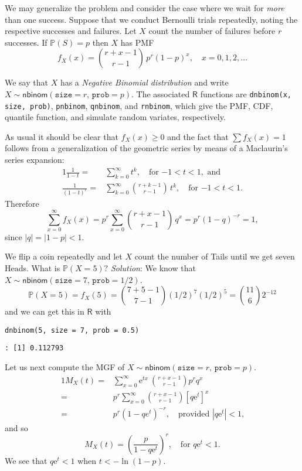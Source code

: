 We may generalize the problem and consider the case where we wait for
\emph{more} than one success. Suppose that we conduct Bernoulli trials
repeatedly, noting the respective successes and failures. Let \(X\)
count the number of failures before \(r\) successes. If
\(\mathbb{P}(S)=p\) then \(X\) has PMF
\begin{equation}
f_{X}(x)={r+x-1 \choose r-1}\, p^{r}(1-p)^{x},\quad x=0,1,2,\ldots
\end{equation}

We say that \(X\) has a \emph{Negative Binomial distribution} and write
\(X\sim\mathsf{nbinom}(\mathtt{size}=r,\,\mathtt{prob}=p)\). The
associated \(\mathsf{R}\) functions are \texttt{dnbinom(x, size, prob)},
\texttt{pnbinom}, \texttt{qnbinom}, and \texttt{rnbinom}, which give the PMF, CDF, quantile
function, and simulate random variates, respectively.

As usual it should be clear that \(f_{X}(x)\geq 0\) and the fact that
\(\sum f_{X}(x)=1\) follows from a generalization of the geometric
series by means of a Maclaurin's series expansion:
\begin{alignat}{1}
\frac{1}{1-t}= & \sum_{k=0}^{\infty}t^{k},\quad \mbox{for \(-1 < t < 1\)},\mbox{ and}\\
\frac{1}{(1-t)^{r}}= & \sum_{k=0}^{\infty}{r+k-1 \choose r-1}\, t^{k},\quad \mbox{for \(-1 < t < 1\)}.
\end{alignat}
Therefore
\begin{equation}
\sum_{x=0}^{\infty}f_{X}(x)=p^{r}\sum_{x=0}^{\infty}{r+x-1 \choose r-1}\, q^{x}=p^{r}(1-q)^{-r}=1,
\end{equation}
since \(|q|=|1-p|<1\). 


We flip a coin repeatedly and let \(X\) count the number of Tails
until we get seven Heads. What is \(\mathbb{P}(X=5)?\) \emph{Solution}: We
know that
\(X\sim\mathsf{nbinom}(\mathtt{size}=7,\,\mathtt{prob}=1/2)\).  
\[
\mathbb{P}(X=5)=f_{X}(5)={7+5-1 \choose 7-1}(1/2)^{7}(1/2)^{5}={11
\choose 6}2^{-12} 
\]
and we can get this in \(\mathsf{R}\) with

\begin{verbatim}
dnbinom(5, size = 7, prob = 0.5)
\end{verbatim}

\begin{verbatim}
: [1] 0.112793
\end{verbatim}

Let us next compute the MGF of
\(X\sim\mathsf{nbinom}(\mathtt{size}=r,\,\mathtt{prob}=p)\).
\begin{alignat*}{1}
M_{X}(t)= & \sum_{x=0}^{\infty}\mathrm{e}^{tx}\ {r+x-1 \choose r-1}p^{r}q^{x}\\
= & p^{r}\sum_{x=0}^{\infty}{r+x-1 \choose r-1}[q\mathrm{e}^{t}]^{x}\\
= & p^{r}(1-qe^{t})^{-r},\quad \mbox{provided $|q\mathrm{e}^{t}|<1$,}
\end{alignat*}
and so
\begin{equation}
M_{X}(t)=\left(\frac{p}{1-q\mathrm{e}^{t}}\right)^{r},\quad \mbox{for $q\mathrm{e}^{t}<1$}.
\end{equation}
We see that \(q\mathrm{e}^{t}<1\) when \(t<-\ln(1-p)\).

